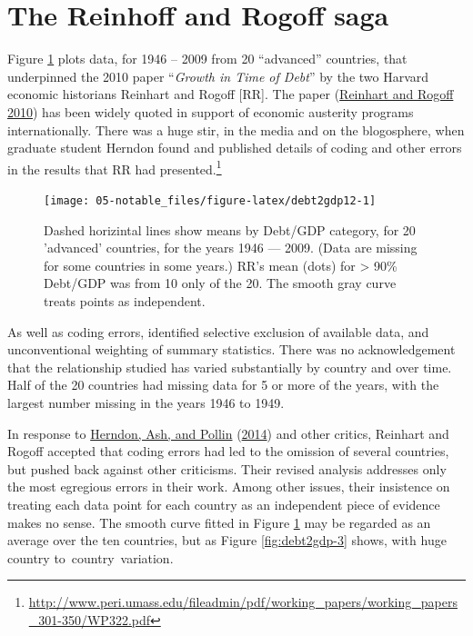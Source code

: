 \documentclass[
  10pt,
  b5paper]{book}
\begin{document}
\hypertarget{the-reinhoff-and-rogoff-saga}{%
\section{The Reinhoff and Rogoff saga}\label{the-reinhoff-and-rogoff-saga}}

Figure \ref{fig:debt2gdp12} plots data, for 1946 -- 2009
from 20 ``advanced'' countries, that underpinned the 2010
paper ``\emph{Growth in Time of Debt}'' by the two Harvard economic
historians Reinhart and Rogoff {[}RR{]}. The paper (\protect\hyperlink{ref-reinhart2010growth}{Reinhart and Rogoff 2010})
has been widely quoted in support of economic austerity programs
internationally. There was a huge stir, in the media and on the
blogosphere, when graduate student Herndon found and published
details of coding and other errors in the results that RR had
presented.\footnote{\url{http://www.peri.umass.edu/fileadmin/pdf/working_papers/working_papers_301-350/WP322.pdf}}

\begin{figure}[H]

{\centering \texttt{[image: 05-notable\_files/figure-latex/debt2gdp12-1]} 

}

\caption{Dashed horizintal lines show means by Debt/GDP category, 
for 20 'advanced' countries, for the years 1946 --- 2009.
(Data are missing for some countries in some years.)
RR's mean (dots) for > 90\% Debt/GDP was from 10 only of the 20. 
The smooth gray curve treats points as independent.}\label{fig:debt2gdp12}
\end{figure}

As well as coding errors, identified selective exclusion of
available data, and unconventional weighting of summary statistics.
There was no acknowledgement that the relationship studied has varied
substantially by country and over time. Half of the 20 countries
had missing data for 5 or more of the years, with the largest
number missing in the years 1946 to 1949.

In response to \protect\hyperlink{ref-herndon2014does}{Herndon, Ash, and Pollin} (\protect\hyperlink{ref-herndon2014does}{2014}) and other critics, Reinhart and
Rogoff accepted that coding errors had led to the omission of
several countries, but pushed back against other criticisms.
Their revised analysis addresses only the most egregious errors
in their work. Among other issues, their insistence on treating
each data point for each country as an independent piece of
evidence makes no sense. The smooth curve fitted in Figure
\ref{fig:debt2gdp12} may be regarded as an average over the
ten countries, but as Figure \ref{fig:debt2gdp-3} shows, with
huge country to~country~variation.
\end{document}
